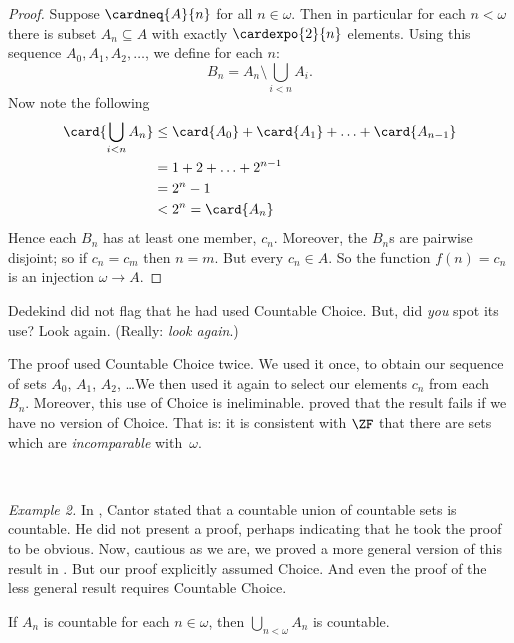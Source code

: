 \documentclass[../../../include/open-logic-section]{subfiles}
\begin{document}
\begin{proof}
Suppose $\cardneq{A}{n}$ for all $n \in \omega$. Then in particular
for each $n < \omega$ there is subset $A_n \subseteq A$ with exactly
$\cardexpo{2}{n}$ elements. Using this sequence $A_0, A_1, A_2,
\ldots$, we define for each $n$:
\[
	B_n = A_n \setminus \bigcup_{i < n} A_i.
\]
Now note the following
\begin{align*}
	\card{\bigcup_{i < n}A_n} 
	&\leq \card{A_0} + \card{A_1} + \ldots + \card{A_{n-1}}\\
	&=1 + 2 + \ldots + 2^{n-1}\\
	& = 2^n - 1\\
	& < 2^n = \card{A_n}
\end{align*}
Hence each $B_n$ has at least one member, $c_n$. Moreover, the $B_n$s
are pairwise disjoint; so if $c_n = c_m$ then $n = m$. But every $c_n
\in A$. So the function  $f(n) = c_n$ is an injection $\omega \to A$.
\end{proof}
\noindent 
Dedekind did not flag that he had used Countable Choice. But, did
\emph{you} spot its use? Look again. (Really: \emph{look again}.)

The proof used Countable Choice twice. We used it {once}, to obtain
our sequence of sets $A_0$, $A_1$, $A_2$, \dots\@ We then used it
again to select our elements $c_n$ from each~$B_n$. Moreover, this use
of Choice is ineliminable. \citet[p.~138]{Cohen1966} proved that the
result fails if we have no version of Choice. That is: it is
consistent with $\ZF$ that there are sets which are
\emph{incomparable} with~$\omega$.


\

\emph{Example 2.} In \citeyear{Cantor1878}, Cantor stated that {a
countable union of countable sets is countable}. He did not present a
proof, perhaps indicating that he took the proof to be obvious. Now,
cautious as we are, we proved a more general version of this result in
.  But our
proof explicitly assumed Choice. And even the proof of the less
general result requires Countable Choice.

\begin{thm}
If $A_n$ is countable for each $n \in \omega$, then $\bigcup_{n <
\omega} A_n$ is countable.
\end{thm}
\end{document}
